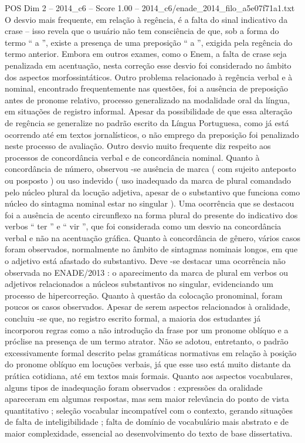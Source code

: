 \begin{textsample}{POS Dim 2 – 2014\_c6 – Score 1.00 – 2014\_c6/enade\_2014\_filo\_a5e07f71a1.txt}
O desvio mais frequente, em relação à regência, é a falta do sinal indicativo da crase – isso revela que o usuário não tem consciência de que, sob a forma do termo “ a ”, existe a presença de uma preposição “ a ”, exigida pela regência do termo anterior.
Embora em outros exames, como o Enem, a falta de crase seja penalizada em acentuação, nesta correção esse desvio foi considerado no âmbito dos aspectos morfossintáticos.
Outro problema relacionado à regência verbal e à nominal, encontrado frequentemente nas questões, foi a ausência de preposição antes de pronome relativo, processo generalizado na modalidade oral da língua, em situações de registro informal.
Apesar da possibilidade de que essa alteração de regência se generalize no padrão escrito da Língua Portuguesa, como já está ocorrendo até em textos jornalísticos, o não emprego da preposição foi penalizado neste processo de avaliação.
Outro desvio muito frequente diz respeito aos processos de concordância verbal e de concordância nominal.
Quanto à concordância de número, observou -se ausência de marca ( com sujeito anteposto ou posposto ) ou uso indevido ( uso inadequado da marca de plural comandado pelo núcleo plural da locução adjetiva, apesar de o substantivo que funciona como núcleo do sintagma nominal estar no singular ).
Uma ocorrência que se destacou foi a ausência de acento circunflexo na forma plural do presente do indicativo dos verbos “ ter ” e “ vir ”, que foi considerada como um desvio na concordância verbal e não na acentuação gráfica.
Quanto à concordância de gênero, vários casos foram observados, normalmente no âmbito de sintagmas nominais longos, em que o adjetivo está afastado do substantivo.
Deve -se destacar uma ocorrência não observada no ENADE/2013 : o aparecimento da marca de plural em verbos ou adjetivos relacionados a núcleos substantivos no singular, evidenciando um processo de hipercorreção.
Quanto à questão da colocação pronominal, foram poucos os casos observados.
Apesar de serem aspectos relacionados à oralidade, concluiu -se que, no registro escrito formal, a maioria dos estudantes já incorporou regras como a não introdução da frase por um pronome oblíquo e a próclise na presença de um termo atrator.
Não se adotou, entretanto, o padrão excessivamente formal descrito pelas gramáticas normativas em relação à posição do pronome oblíquo em locuções verbais, já que esse uso está muito distante da prática cotidiana, até em textos mais formais.
Quanto aos aspectos vocabulares, alguns tipos de inadequação foram observados : expressões da oralidade apareceram em algumas respostas, mas sem maior relevância do ponto de vista quantitativo ; seleção vocabular incompatível com o contexto, gerando situações de falta de inteligibilidade ; falta de domínio de vocabulário mais abstrato e de maior complexidade, essencial ao desenvolvimento do texto de base dissertativa.

\end{textsample}
